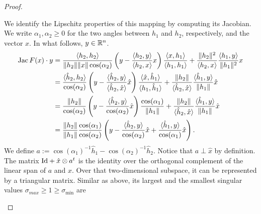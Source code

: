 \documentclass[10pt,letterpaper]{article}
\begin{document}
\begin{proof}
\begin{itemize}
        We identify the Lipschitz properties of this mapping by computing its Jacobian. 
        We write $\alpha_1, \alpha_2 \geq 0$ for the two angles between $h_1$ and $h_2$, respectively, and the vector $x$.
        In what follows, $y \in {\mathbb R}^{n}$.
        \begin{align*}
            \operatorname{{\rm Jac}} F(x) \cdot y
            &=
            \frac{ \langle h_2, h_2 \rangle }{ \|h_2\| \|x\| \cos(\alpha_2) }
            \left( y - \frac{ \langle h_2, y \rangle }{ \langle h_2, x \rangle } x \right)
            \frac{ \langle x, h_1 \rangle }{ \langle h_1, h_1 \rangle }
            +
            \frac{ \| h_2 \|^{2} }{ \langle h_2, x \rangle }
            \frac{ \langle h_1, y \rangle }{ \| h_1 \|^{2} }
            x
            \\&=
            \frac{ \langle \hat h_2, h_2 \rangle }{ \cos(\alpha_2) }
            \left( y - \frac{ \langle \hat h_2, y \rangle }{ \langle \hat h_2, \hat x \rangle } \hat x \right)
            \frac{ \langle \hat x, \hat h_1 \rangle }{ \langle h_1, \hat h_1 \rangle }
            +
            \frac{ \| h_2 \| }{ \langle \hat h_2, \hat x \rangle }
            \frac{ \langle \hat h_1, y \rangle }{ \| h_1 \| }
            \hat x
            \\&=
            \frac{ \| h_2 \| }{ \cos(\alpha_2) }
            \left( y - \frac{ \langle \hat h_2, y \rangle }{ \cos(\alpha_2) } \hat x \right)
            \frac{ \cos(\alpha_1) }{ \| h_1 \| }
            +
            \frac{ \| h_2 \| }{ \langle \hat h_2, \hat x \rangle }
            \frac{ \langle \hat h_1, y \rangle }{ \| h_1 \| }
            \hat x
            \\&=
            \frac{ \| h_2 \| }{ \| h_1 \| }
            \frac{ \cos(\alpha_1) }{ \cos(\alpha_2) }
            \left( 
                y 
                - 
                \frac{ \langle \hat h_2, y \rangle }{ \cos(\alpha_2) } \hat x 
                + 
                \frac{ \langle \hat h_1, y \rangle }{ \cos(\alpha_1) } \hat x 
            \right)
            .
        \end{align*}
        We define $a := \cos(\alpha_1)^{-1} \hat h_1 - \cos(\alpha_2)^{-1} \hat h_2$. 
        Notice that $a \perp \hat x$ by definition. The matrix ${\rm Id} + \hat x \otimes a^{t}$ is the identity over the orthogonal complement of the linear span of $a$ and $x$. Over that two-dimensional subspace, it can be represented by a triangular matrix.
        Similar as above, its largest and the smallest singular values $\sigma_{max} \geq 1 \geq \sigma_{\min}$ are

\end{itemize}
\end{proof}
\end{document}
